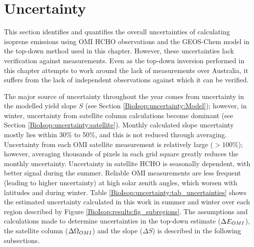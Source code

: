     
    
\section{Uncertainty}
\label{BioIsop:uncertainty}
  
  
  This section identifies and quantifies the overall uncertainties of calculating isoprene emissions using OMI HCHO observations and the GEOS-Chem model in the top-down method used in this chapter.
  However, these uncertainties lack verification against measurements.
  Even as the top-down inversion performed in this chapter attempts to work around the lack of measurements over Australia, it suffers from the lack of independent observations against which it can be verified.
  
  The major source of uncertainty throughout the year comes from uncertainty in the modelled yield slope $S$ (see Section \ref{BioIsop:uncertainty:Model}); however, in winter, uncertainty from satellite column calculations become dominant (see Section \ref{BioIsop:uncertainty:satellite}).
  Monthly calculated slope uncertainty mostly lies within 30\% to 50\%, and this is not reduced through averaging.
  Uncertainty from each OMI satellite measurement is relatively large ($>100\%$); however, averaging thousands of pixels in each grid square greatly reduces the monthly uncertainty.
  Uncertainty in satellite HCHO is seasonally dependent, with better signal during the summer.
  Reliable OMI measurements are less frequent (leading to higher uncertainty) at high solar zenith angles, which worsen with latitudes and during winter.
  Table \ref{BioIsop:uncertainty:tab_uncertainties} shows the estimated uncertainty calculated in this work in summer and winter over each region described by Figure \ref{BioIsop:results:fig_subregions}.
  The assumptions and calculations made to determine uncertainties in the top-down estimate ($\Delta E_{OMI}$), the satellite column ($\Delta \Omega_{OMI}$) and the slope ($\Delta S$) is described in the following subsections.
  
